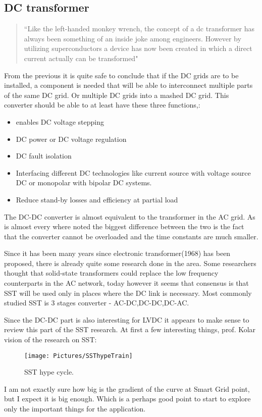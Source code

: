 \documentclass[]{scrartcl}
\begin{document}
\subsection{DC transformer}
\begin{quotation}
	``Like the left-handed monkey wrench, the concept of a dc transformer has always been something of an inside joke among engineers. However by utilizing superconductors a device has now been created in which a direct current actually can be transformed" \cite{Although}
\end{quotation}


From the previous it is quite safe to conclude that if the DC grids are to be installed, a component is needed that will be able to interconnect multiple parts of the same DC grid. Or multiple DC grids into a mashed DC grid. This converter should be able to at least have these three functions\cite{FeasibilityofDCtransmissionnetworks},\cite{Jovcic2014}:
\begin{itemize}
	\item enables DC voltage stepping
	\item DC power or DC voltage regulation
	\item DC fault isolation
	\item Interfacing different DC technologies like current source with voltage source DC or monopolar with bipolar DC systems.
	\item Reduce stand-by losses and efficiency at partial load
\end{itemize}

The DC-DC converter is almost equivalent to the transformer in the AC grid. As is almost every where noted the biggest difference between the two is the fact that the converter cannot be overloaded and the time constants are much smaller. 

Since it has been many years since electronic transformer(1968) has been proposed, there is already quite some research done in the area. Some researchers thought that solid-state transformers could replace the low frequency counterparts in the AC network, today however it seems that consensus is that SST will be used only in places where the DC link is necessary\cite{Kolar2014d}. Most commonly studied SST is 3 stages converter - AC-DC,DC-DC,DC-AC. 

Since the DC-DC part is also interesting for LVDC it appears to make sense to review this part of the SST research. At first a few interesting things, prof. Kolar vision of the research on SST:
\begin{figure}[h!]
	\centering
	\texttt{[image: Pictures/SSThypeTrain]}
	\caption{SST hype cycle.}
	\label{fig:SSThypeTrain}
\end{figure}
\newpage
I am not exactly sure how big is the gradient of the curve at Smart Grid point, but I expect it is big enough. Which is a perhaps good point to start to explore only the important things for the application. 
\end{document}
